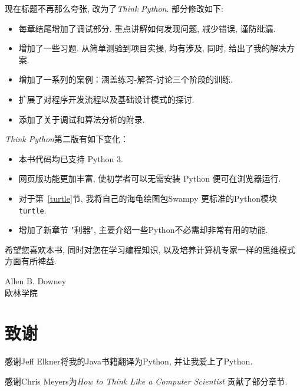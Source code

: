 \documentclass[10pt]{book}
\begin{document}
现在标题不再那么夸张, 改为了{\em Think Python}. 
部分修改如下:

\begin{itemize}

\item 每章结尾增加了调试部分. 
重点讲解如何发现问题, 减少错误, 谨防纰漏. 

\item 增加了一些习题. 从简单测验到项目实操, 
均有涉及, 同时, 给出了我的解决方案. 

\item 增加了一系列的案例：涵盖练习-解答-讨论三个阶段的训练. 

\item 扩展了对程序开发流程以及基础设计模式的探讨. 

\item 添加了关于调试和算法分析的附录. 

\end{itemize}

{\em Think Python}第二版有如下变化：

\begin{itemize}

\item 本书代码均已支持 Python 3.

\item 网页版功能更加丰富, 使初学者可以无需安装 Python 便可在浏览器运行. 

\item 对于第~\ref{turtle}节, 我将自己的海龟绘图包Swampy 更标准的Python模块{\tt turtle}. 

\item 增加了新章节 "利器", 主要介绍一些Python不必需却非常有用的功能. 

\end{itemize}

希望您喜欢本书, 同时对您在学习编程知识, 以及培养计算机专家一样的思维模式
方面有所裨益. 



Allen B. Downey \\

欧林学院 \\


\section*{致谢}

感谢Jeff Elkner将我的Java书籍翻译为Python, 
并让我爱上了Python.

感谢Chris Meyers为{\em How to Think Like a Computer Scientist}
贡献了部分章节. 
\end{document}
